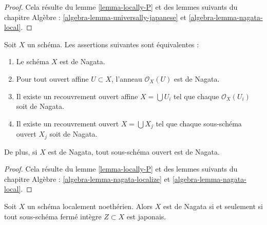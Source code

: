 \begin{proof}
Cela résulte du lemme \ref{lemma-locally-P} et des
lemmes suivants du chapitre Algèbre : \ref{algebra-lemma-universally-japanese} et
\ref{algebra-lemma-nagata-local}.
\end{proof}

\begin{lemma}
\label{lemma-locally-nagata}
Soit $X$ un schéma. Les assertions suivantes sont équivalentes :
\begin{enumerate}
\item Le schéma $X$ est de Nagata.
\item Pour tout ouvert affine $U \subset X$, l'anneau $\mathcal{O}_X(U)$
est de Nagata.
\item Il existe un recouvrement ouvert affine $X = \bigcup U_i$
tel que chaque $\mathcal{O}_X(U_i)$ soit de Nagata.
\item Il existe un recouvrement ouvert $X = \bigcup X_j$
tel que chaque sous-schéma ouvert $X_j$ soit de Nagata.
\end{enumerate}
De plus, si $X$ est de Nagata, tout sous-schéma ouvert est de Nagata.
\end{lemma}

\begin{proof}
Cela résulte du lemme \ref{lemma-locally-P} et des
lemmes suivants du chapitre Algèbre : \ref{algebra-lemma-nagata-localize} et
\ref{algebra-lemma-nagata-local}.
\end{proof}

\begin{lemma}
\label{lemma-characterize-nagata}
Soit $X$ un schéma localement noethérien.
Alors $X$ est de Nagata si et seulement si tout sous-schéma fermé intègre
$Z \subset X$ est japonais.
\end{lemma}

